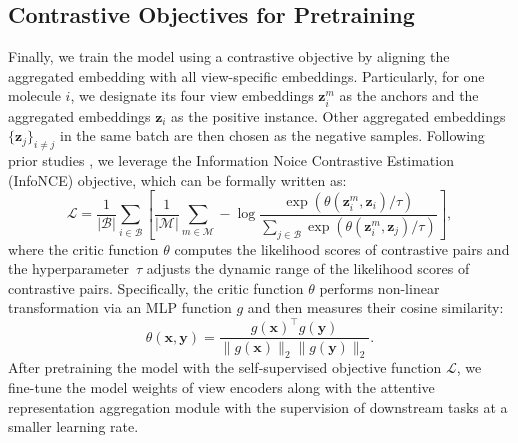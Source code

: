 \subsection{Contrastive Objectives for Pretraining}
Finally, we train the model using a contrastive objective by aligning the aggregated embedding with all view-specific embeddings.
Particularly, for one molecule \(i\), we designate its four view embeddings \(\bm{z}_i^m\) as the anchors and the aggregated embeddings \(\bm{z}_i\) as the positive instance. Other aggregated embeddings \(\{\bm{z}_j\}_{i \neq j}\) in the same batch are then chosen as the negative samples.
Following prior studies \cite{Chen:2020wj,He:2020tu,Bachman:2019wp,Zhu:2020vf,You:2020ut,Zhu:2021tu}, we leverage the Information Noice Contrastive Estimation (InfoNCE) objective, which can be formally written as:
\begin{equation}
	\mathcal{L} = \frac{1}{|\mathcal{B}|} \sum_{i \in \mathcal{B}} \left[ \frac{1}{|\mathcal{M}|} \sum_{m \in \mathcal{M}} -\log \frac{\exp(\theta(\bm{z}_i^m, \bm{z}_i)/\tau)}{\sum_{j \in \mathcal{B}} \exp(\theta(\bm{z}_i^m, \bm{z}_j) / \tau)} \right],
	\label{eq:objective}
\end{equation}
where the critic function \(\theta\) computes the likelihood scores of contrastive pairs and the hyperparameter~\(\tau\) adjusts the dynamic range of the likelihood scores of contrastive pairs.
Specifically, the critic function \(\theta\) performs non-linear transformation via an MLP function \(g\) \cite{Chen:2020wj} and then measures their cosine similarity:
\begin{equation}
	\theta(\bm{x}, \bm{y}) = \frac{g(\bm{x})^\top g(\bm{y})}{\|g(\bm{x})\|_2\|g(\bm{y})\|_2}.
\end{equation}
After pretraining the model with the self-supervised objective function \(\mathcal{L}\), we fine-tune the model weights of view encoders along with the attentive representation aggregation module with the supervision of downstream tasks at a smaller learning rate.
